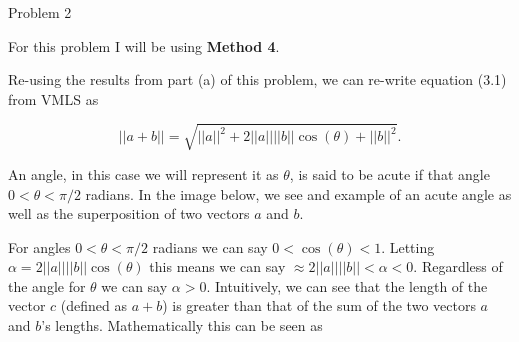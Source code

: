 \begin{problem}{Problem 2}
    \begin{highlight}
        For this problem I will be using \textbf{Method 4}. \vspace*{1em}

        Re-using the results from part (a) of this problem, we can re-write equation (3.1) from VMLS as 

        \begin{equation}
            ||a + b|| = \sqrt{||a||^{2} + 2||a||||b||\cos{(\theta)} + ||b||^2}.
        \end{equation}

        An angle, in this case we will represent it as $\theta$, is said to be acute if that angle $0 < \theta < \pi /2$ radians. In the image below, we see and example of an acute angle as well as
        the superposition of two vectors $a$ and $b$.

        \begin{center}
            \hspace*{10pt}
        \end{center}

        For angles $0 < \theta < \pi / 2$ radians we can say $0 < \cos{(\theta) < 1}$. Letting $\alpha = 2||a||||b||\cos{(\theta)}$ this means we can say $\approx 2||a||||b|| < \alpha < 0$. Regardless 
        of the angle for $\theta$ we can say $\alpha > 0$. Intuitively, we can see that the length of the vector $c$ (defined as $a+b$) is greater than that of the sum of the two vectors $a$ and $b$'s 
        lengths. Mathematically this can be seen as


\end{highlight}
\end{problem}
